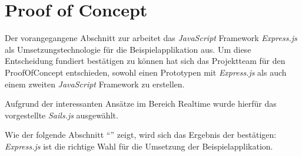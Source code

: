 \section{Proof of Concept}
\label{sec:proof-of-concept}

Der vorangegangene Abschnitt zur  arbeitet das \emph{JavaScript} Framework \emph{Express.js} als Umsetzungstechnologie für die Beispielapplikation aus. Um diese Entscheidung fundiert bestätigen zu können hat sich das Projektteam für den \gls{ProofOfConcept} entschieden, sowohl einen Prototypen mit \emph{Express.js} als auch einem zweiten \emph{JavaScript} Framework zu erstellen.

Aufgrund der interessanten Ansätze im Bereich \gls{Realtime} wurde hierfür das vorgestellte \emph{Sails.js} ausgewählt.

Wie der folgende Abschnitt ``'' zeigt, wird sich das Ergebnis der  bestätigen: \emph{Express.js} ist die richtige Wahl für die Umsetzung der Beispielapplikation.



